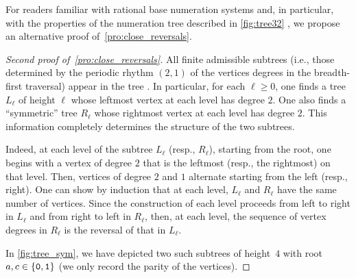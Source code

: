 \documentclass[12pt,reqno]{article}
\begin{document}
For readers familiar with rational base numeration systems and, in particular, with the properties of the numeration tree described in \cref{fig:tree32} \cite{Marsault,RigSti1},  we propose an alternative proof of~\cref{pro:close_reversals}.  


\begin{proof}[Second proof of~\cref{pro:close_reversals}]
All finite admissible subtrees (i.e., those determined by the periodic rhythm $(2,1)$ of the vertices degrees in the breadth-first traversal) appear in the tree \cite{Marsault}. In particular,  for each $\ell\ge 0$,  one finds a tree $L_\ell$ of height $\ell$ whose leftmost vertex at each level has degree $2$. One also finds a ``symmetric'' tree $R_\ell$ whose rightmost vertex at each level has degree $2$. This information completely determines the structure of the two subtrees. 

Indeed,  at each level of the subtree $L_\ell$ (resp.,  $R_\ell$), starting from the root, one begins with a vertex of degree $2$ that is the leftmost (resp.,  the rightmost) on that level. Then,  vertices of degree $2$ and $1$ alternate starting from the left (resp.,  right). One can show by induction that at each level, $L_\ell$ and $R_\ell$ have the same number of vertices. Since the construction of each level proceeds from left to right in $L_\ell$ and from right to left in $R_\ell$, then,  at each level, the sequence of vertex degrees in $R_\ell$ is the reversal of that in $L_\ell$.

In \cref{fig:tree_sym}, we have depicted two such subtrees of height~$4$ with root $a,c\in\{{\tt 0},{\tt 1}\}$ (we only record the parity of the vertices). 


\end{proof}
\end{document}
